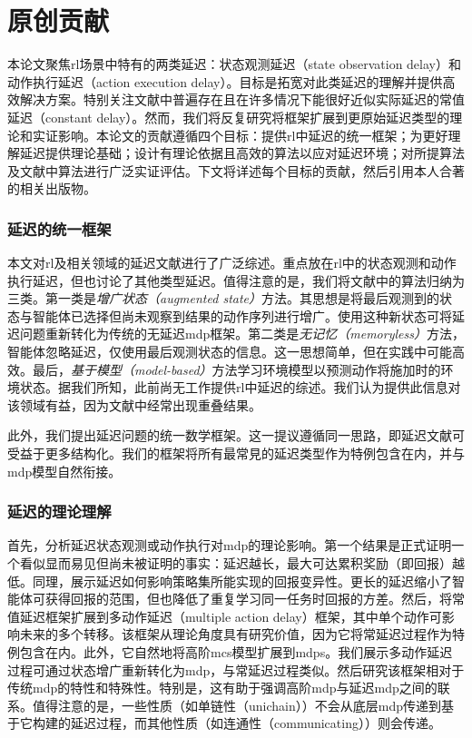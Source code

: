 \section{原创贡献}

本论文聚焦\gls{rl}场景中特有的两类延迟：状态观测延迟（state observation delay）和动作执行延迟（action execution delay）。目标是拓宽对此类延迟的理解并提供高效解决方案。特别关注文献中普遍存在且在许多情况下能很好近似实际延迟的常值延迟（constant delay）。然而，我们将反复研究将框架扩展到更原始延迟类型的理论和实证影响。本论文的贡献遵循四个目标：提供\gls{rl}中延迟的统一框架；为更好理解延迟提供理论基础；设计有理论依据且高效的算法以应对延迟环境；对所提算法及文献中算法进行广泛实证评估。下文将详述每个目标的贡献，然后引用本人合著的相关出版物。

\subsubsection{延迟的统一框架}

本文对\gls{rl}及相关领域的延迟文献进行了广泛综述。重点放在\gls{rl}中的状态观测和动作执行延迟，但也讨论了其他类型延迟。值得注意的是，我们将文献中的算法归纳为三类。第一类是\emph{增广状态（augmented state）}方法。其思想是将最后观测到的状态与智能体已选择但尚未观察到结果的动作序列进行增广。使用这种新状态可将延迟问题重新转化为传统的无延迟\gls{mdp}框架。第二类是\emph{无记忆（memoryless）}方法，智能体忽略延迟，仅使用最后观测状态的信息。这一思想简单，但在实践中可能高效。最后，\emph{基于模型（model-based）}方法学习环境模型以预测动作将施加时的环境状态。据我们所知，此前尚无工作提供\gls{rl}中延迟的综述。我们认为提供此信息对该领域有益，因为文献中经常出现重叠结果。

此外，我们提出延迟问题的统一数学框架。这一提议遵循同一思路，即延迟文献可受益于更多结构化。我们的框架将所有最常見的延迟类型作为特例包含在内，并与\gls{mdp}模型自然衔接。

\subsubsection{延迟的理论理解}

首先，分析延迟状态观测或动作执行对\gls{mdp}的理论影响。第一个结果是正式证明一个看似显而易见但尚未被证明的事实：延迟越长，最大可达累积奖励（即回报）越低。同理，展示延迟如何影响策略集所能实现的回报变异性。更长的延迟缩小了智能体可获得回报的范围，但也降低了重复学习同一任务时回报的方差。然后，将常值延迟框架扩展到多动作延迟（multiple action delay）框架，其中单个动作可影响未来的多个转移。该框架从理论角度具有研究价值，因为它将常延迟过程作为特例包含在内。此外，它自然地将高阶\glspl{mc}模型扩展到\glspl{mdp}。我们展示多动作延迟过程可通过状态增广重新转化为\gls{mdp}，与常延迟过程类似。然后研究该框架相对于传统\gls{mdp}的特性和特殊性。特别是，这有助于强调高阶\gls{mdp}与延迟\gls{mdp}之间的联系。值得注意的是，一些性质（如单链性（unichain））不会从底层\gls{mdp}传递到基于它构建的延迟过程，而其他性质（如连通性（communicating））则会传递。

